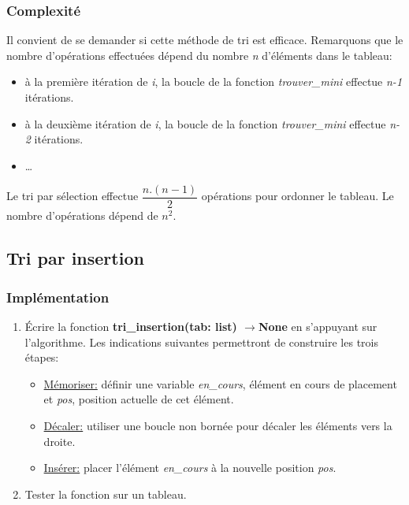 \documentclass[a4paper,11pt]{article}
\begin{document}
\subsubsection{Complexité}
Il convient de se demander si cette méthode de tri est efficace. Remarquons que le nombre d'opérations effectuées dépend du nombre \emph{n} d'éléments dans le tableau:
\begin{itemize}
    \item à la première itération de \emph{i}, la boucle de la fonction \emph{trouver\_mini} effectue \emph{n-1} itérations.
    \item à la deuxième itération de \emph{i}, la boucle de la fonction \emph{trouver\_mini} effectue \emph{n-2} itérations.
    \item \dots
\end{itemize}
\begin{aretenir}[]
Le tri par sélection effectue $\dfrac{n.(n-1)}{2}$ opérations pour ordonner le tableau. Le nombre d'opérations dépend de $n^2$.
\end{aretenir}
\subsection{Tri par insertion}
\subsubsection{Implémentation}
\begin{activite}
\begin{enumerate}
    \item Écrire la fonction \textbf{tri\_insertion(tab: list) $\rightarrow$None} en s'appuyant sur l'algorithme. Les indications suivantes permettront de construire les trois étapes:
    \begin{itemize}
        \item \underline{Mémoriser:} définir une variable \emph{en\_cours}, élément en cours de placement et \emph{pos}, position actuelle de cet élément.
        \item \underline{Décaler:} utiliser une boucle non bornée pour décaler les éléments vers la droite.
        \item \underline{Insérer:} placer l'élément \emph{en\_cours} à la nouvelle position \emph{pos}.
    \end{itemize}
    \item Tester la fonction sur un tableau.
\end{enumerate}
\end{activite}
\end{document}
